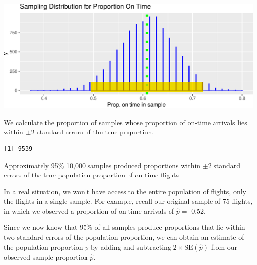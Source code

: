 \documentclass[
  letterpaper,
  DIV=11,
  numbers=noendperiod]{scrreprt}
\newenvironment{Shaded}{\begin{snugshade}}{\end{snugshade}}
\newcommand{\DecValTok}[1]{\textcolor[rgb]{0.68,0.00,0.00}{#1}}
\newcommand{\FunctionTok}[1]{\textcolor[rgb]{0.28,0.35,0.67}{#1}}
\newcommand{\NormalTok}[1]{\textcolor[rgb]{0.00,0.23,0.31}{#1}}
\newcommand{\OtherTok}[1]{\textcolor[rgb]{0.00,0.23,0.31}{#1}}
\newcommand{\SpecialCharTok}[1]{\textcolor[rgb]{0.37,0.37,0.37}{#1}}
\begin{document}
\includegraphics{Ch3_files/figure-pdf/unnamed-chunk-31-1.pdf}

We calculate the proportion of samples whose proportion of on-time
arrivals lies within \(\pm 2\) standard errors of the true proportion.

\begin{Shaded}
\end{Shaded}

\begin{verbatim}
[1] 9539
\end{verbatim}

Approximately 95\% 10,000 samples produced proportions within \(\pm 2\)
standard errors of the true population proportion of on-time flights.

In a real situation, we won't have access to the entire population of
flights, only the flights in a single sample. For example, recall our
original sample of 75 flights, in which we observed a proportion of
on-time arrivals of \(\hat{p}=\) 0.52.

Since we now know that 95\% of all samples produce proportions that lie
within two standard errors of the population proportion, we can obtain
an estimate of the population proportion \(p\) by adding and subtracting
\(2\times \text{SE}(\hat{p})\) from our observed sample proportion
\(\hat{p}\).
\end{document}

